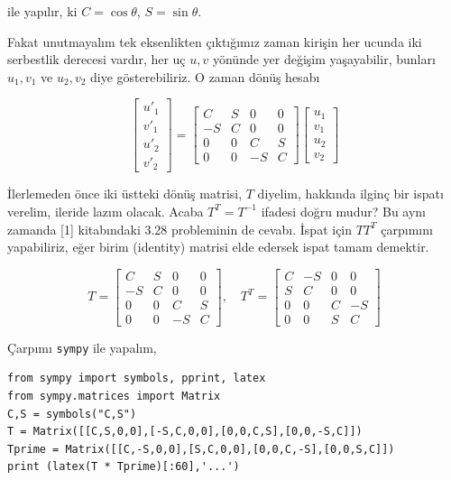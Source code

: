 \documentclass[12pt,fleqn]{article}\usepackage{../../common}
\begin{document}
ile yapılır, ki $C = \cos\theta$, $S = \sin\theta$.

Fakat unutmayalım tek eksenlikten çıktığımız zaman kirişin her ucunda iki
serbestlik derecesi vardır, her uç $u,v$ yönünde yer değişim yaşayabilir,
bunları $u_1,v_1$ ve $u_2,v_2$ diye gösterebiliriz. O zaman dönüş hesabı

$$
\left[\begin{array}{c}
u'_1 \\ v'_1 \\ u'_2 \\ v'_2
\end{array}\right] =
\left[\begin{array}{cccc}
C & S & 0 & 0 \\
-S & C & 0 & 0 \\
0 & 0 & C & S \\
0 & 0 & -S & C 
\end{array}\right]
\left[\begin{array}{c}
u_1 \\ v_1 \\ u_2 \\ v_2
\end{array}\right]
$$

İlerlemeden önce iki üstteki dönüş matrisi, $T$ diyelim, hakkında ilginç bir
ispatı verelim, ileride lazım olacak. Acaba $T^T = T^{-1}$ ifadesi doğru mudur?
Bu aynı zamanda [1] kitabındaki 3.28 probleminin de cevabı. İspat için $T T^T$
çarpımını yapabiliriz, eğer birim (identity) matrisi elde edersek ispat tamam
demektir.

$$
T = 
\left[\begin{array}{cccc}
C & S & 0 & 0 \\
-S & C & 0 & 0 \\
0 & 0 & C & S \\
0 & 0 & -S & C 
\end{array}\right], \quad
T^T = 
\left[\begin{array}{cccc}
C & -S & 0 & 0 \\
S & C & 0 & 0 \\
0 & 0 & C & -S \\
0 & 0 & S & C 
\end{array}\right]
$$

Çarpımı \verb!sympy! ile yapalım,

\begin{verbatim}
from sympy import symbols, pprint, latex
from sympy.matrices import Matrix
C,S = symbols("C,S")
T = Matrix([[C,S,0,0],[-S,C,0,0],[0,0,C,S],[0,0,-S,C]])
Tprime = Matrix([[C,-S,0,0],[S,C,0,0],[0,0,C,-S],[0,0,S,C]])
print (latex(T * Tprime)[:60],'...')
\end{verbatim}
\end{document}
